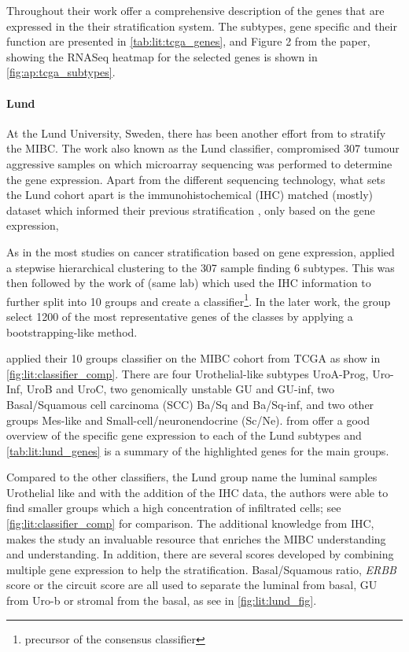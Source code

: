 Throughout their work \citet{Robertson2017-mg} offer a comprehensive description of the genes that are expressed in the their stratification system. The subtypes, gene specific and their function are presented in \cref{tab:lit:tcga_genes}, and Figure 2 from the paper, showing the RNASeq heatmap for the selected genes is shown in \cref{fig:ap:tcga_subtypes}.


\paragraph*{Lund} \label{s:lit:lund_mibc}

At the Lund University, Sweden, there has been another effort from \citet{Sjodahl2017-xr,Marzouka2018-ge} to stratify the MIBC. The work also known as the Lund classifier, compromised 307 tumour aggressive samples on which microarray sequencing was performed to determine the gene expression. Apart from the different sequencing technology, what sets the Lund cohort apart is the immunohistochemical (IHC) matched (mostly) dataset which informed their previous stratification \citet{Sjodahl2017-xr}, only based on the gene expression,

As in the most studies on cancer stratification based on gene expression, \citet{Sjodahl2017-xr} applied a stepwise hierarchical clustering to the 307 sample finding 6 subtypes. This was then followed by the work of \citet{Marzouka2018-ge} (same lab) which used the IHC information to further split into 10 groups and create a classifier\footnote{precursor of the consensus classifier}. In the later work, the group select 1200 of the most representative genes of the classes by applying a bootstrapping-like method.

\citet{Marzouka2018-ge} applied their 10 groups classifier on the MIBC cohort from TCGA as show in \cref{fig:lit:classifier_comp}. There are four Urothelial-like subtypes UroA-Prog, Uro-Inf, UroB and UroC, two genomically unstable GU and GU-inf, two Basal/Squamous cell carcinoma (SCC) Ba/Sq and Ba/Sq-inf, and two other groups Mes-like and Small-cell/neuronendocrine (Sc/Ne).  from \citet{Marzouka2018-ge} offer a good overview of the specific gene expression to each of the Lund subtypes and \cref{tab:lit:lund_genes} is a summary of the highlighted genes for the main groups.


Compared to the other classifiers, the Lund group name the luminal samples Urothelial like and with the addition of the IHC data, the authors were able to find smaller groups which a high concentration of infiltrated cells; see \cref{fig:lit:classifier_comp} for comparison. The additional knowledge from IHC, makes the study an invaluable resource that enriches the MIBC understanding and understanding. In addition, there are several scores developed by combining multiple gene expression to help the stratification. Basal/Squamous ratio, \textit{ERBB} score or the circuit score are all used to separate the luminal from basal, GU from Uro-b or stromal from the basal, as see in \cref{fig:lit:lund_fig}.


